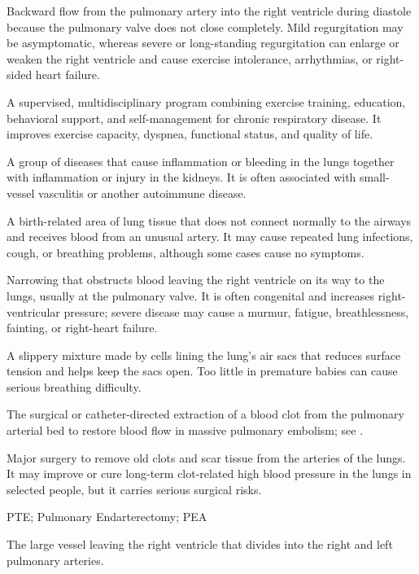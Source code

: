  Backward flow from the pulmonary artery into the right ventricle during diastole because the pulmonary valve does not close completely. Mild regurgitation may be asymptomatic, whereas severe or long-standing regurgitation can enlarge or weaken the right ventricle and cause exercise intolerance, arrhythmias, or right-sided heart failure.

 A supervised, multidisciplinary program combining exercise training, education,
behavioral support, and self-management for chronic respiratory disease. It improves
exercise capacity, dyspnea, functional status, and quality of life.

 A group of diseases that cause inflammation or bleeding in the lungs together with inflammation or injury in the kidneys. It is often associated with small-vessel vasculitis or another autoimmune disease.

 A birth-related area of lung tissue that does not connect normally to the airways and receives blood from an unusual artery. It may cause repeated lung infections, cough, or breathing problems, although some cases cause no symptoms.

 Narrowing that obstructs blood leaving the right ventricle on its way to the lungs, usually at the pulmonary valve. It is often congenital and increases right-ventricular pressure; severe disease may cause a murmur, fatigue, breathlessness, fainting, or right-heart failure.

 A slippery mixture made by cells lining the lung’s air sacs that reduces surface tension and helps keep the sacs open. Too little in premature babies can cause serious breathing difficulty.

 The surgical or catheter-directed extraction of a blood clot from the pulmonary arterial bed to restore blood flow in massive pulmonary embolism; see .

 Major surgery to remove old clots and scar tissue from the arteries of the lungs. It may improve or cure long-term clot-related high blood pressure in the lungs in selected people, but it carries serious surgical risks.

\synonyms
PTE; Pulmonary Endarterectomy; PEA

 The large vessel leaving the right ventricle that divides into the right and left pulmonary arteries.

